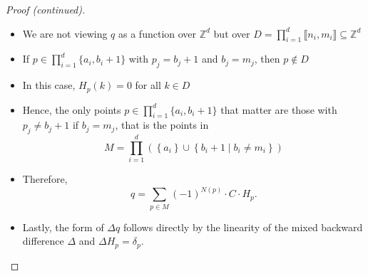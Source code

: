 \documentclass[
    t,10pt,
    handout
]{beamer}
\let\qedhere\relax
\newif\ifqedplaced
\newcommand{\qedhere}{\hfill$\square$\global\qedplacedtrue}
\begin{document}
\begin{frame}
    \begin{proof}[Proof (continued)]
        \begin{itemize}[<+->] 
            \item We are not viewing \( q \) as a function over \( \mathbb{Z}^d \) but over \( D = \prod_{i=1}^d \llbracket n_i, m_i \rrbracket \subseteq \mathbb{Z}^d \)
            \item If \( p \in \prod_{i=1}^d \{a_i,b_i+1\} \) with \( p_j = b_j+1 \) and \( b_j = m_j \), then \( p \notin D \)
            \item In this case, \( H_p(k) = 0 \) for all \( k \in D \) 
            \item Hence, the only points \( p \in \prod_{i=1}^d \{a_i,b_i+1\} \) that matter are those with \( p_j \neq b_j+1 \) if \( b_j = m_j \), that is the points in 
                \begin{equation*}
                    M = \prod_{i=1}^d \left( \left\{a_i\right\} \cup \left\{ b_i + 1 \mid b_i \neq m_i \right\} \right)
                \end{equation*}
            \item Therefore, 
                \begin{equation*}
                    q = \sum_{p \in M} (-1)^{N(p)} \cdot C \cdot H_p. 
                \end{equation*}
            \item Lastly, the form of \( \Delta q \) follows directly by the linearity of the mixed backward difference \( \Delta \) and \( \Delta H_p = \delta_p \). \qedhere
        \end{itemize}
    \end{proof}
\end{frame}
\end{document}
